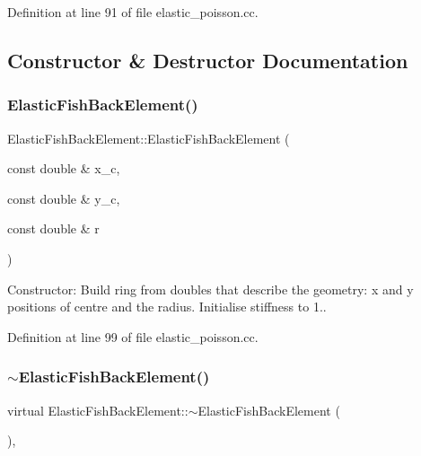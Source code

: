 Definition at line 91 of file elastic\+\_\+poisson.\+cc.



\subsection{Constructor \& Destructor Documentation}
\mbox{\label{classElasticFishBackElement_a0411850f03db9f6eeb10562be778dacb}} 
\subsubsection{\texorpdfstring{Elastic\+Fish\+Back\+Element()}{ElasticFishBackElement()}}
{\footnotesize\ttfamily Elastic\+Fish\+Back\+Element\+::\+Elastic\+Fish\+Back\+Element (\begin{DoxyParamCaption}\item[{const double \&}]{x\+\_\+c,  }\item[{const double \&}]{y\+\_\+c,  }\item[{const double \&}]{r }\end{DoxyParamCaption})\hspace{0.3cm}{\ttfamily [inline]}}



Constructor\+: Build ring from doubles that describe the geometry\+: x and y positions of centre and the radius. Initialise stiffness to 1.. 



Definition at line 99 of file elastic\+\_\+poisson.\+cc.

\mbox{\label{classElasticFishBackElement_a3889028a8375ef126ec207f73ca18adc}} 
\subsubsection{\texorpdfstring{$\sim$\+Elastic\+Fish\+Back\+Element()}{~ElasticFishBackElement()}}
{\footnotesize\ttfamily virtual Elastic\+Fish\+Back\+Element\+::$\sim$\+Elastic\+Fish\+Back\+Element (\begin{DoxyParamCaption}{ }\end{DoxyParamCaption})\hspace{0.3cm}{\ttfamily [inline]}, {\ttfamily [virtual]}}



